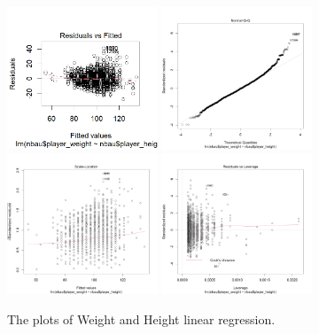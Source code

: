 \documentclass[11pt,letterpaper]{amsart}
\begin{document}
\begin{figure}[H] 
\includegraphics[width=0.4\textwidth]{lmplot5}\hspace{1cm}
\includegraphics[width=0.4\textwidth]{lmplot6}\hspace{1cm}
\includegraphics[width=0.4\textwidth]{lmplot7}\hspace{1cm}
\includegraphics[width=0.4\textwidth]{lmplot8}\hspace{1cm}
\caption{The plots of Weight and Height linear regression. \label{fig2}}
\end{figure} \leavevmode
\end{document}
